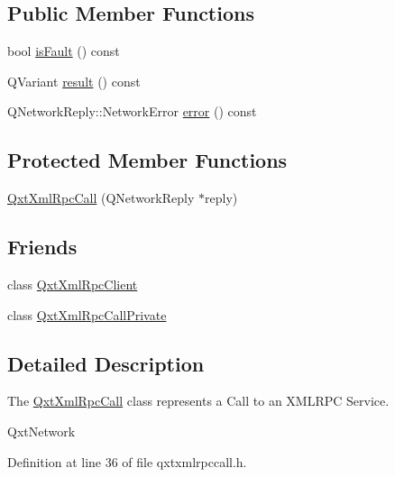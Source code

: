 \subsection*{Public Member Functions}
\begin{DoxyCompactItemize}
\item 
bool \hyperlink{class_qxt_xml_rpc_call_ace6d7c474d02814459d06bb5fdd4cf38}{is\-Fault} () const 
\item 
Q\-Variant \hyperlink{class_qxt_xml_rpc_call_ab9f0cf68b3df46df0869b1151cec5679}{result} () const 
\item 
Q\-Network\-Reply\-::\-Network\-Error \hyperlink{class_qxt_xml_rpc_call_a9b0287ce68a4fdedc83f182f1774b299}{error} () const 
\end{DoxyCompactItemize}
\subsection*{Protected Member Functions}
\begin{DoxyCompactItemize}
\item 
\hyperlink{class_qxt_xml_rpc_call_ae2efa1872f298cf6ec2bd3164732b65e}{Qxt\-Xml\-Rpc\-Call} (Q\-Network\-Reply $\ast$reply)
\end{DoxyCompactItemize}
\subsection*{Friends}
\begin{DoxyCompactItemize}
\item 
class \hyperlink{class_qxt_xml_rpc_call_aea1a90c8570af2b2d82b175cd24007d9}{Qxt\-Xml\-Rpc\-Client}
\item 
class \hyperlink{class_qxt_xml_rpc_call_aba91315452bd2c1855a6e5de23cc17fb}{Qxt\-Xml\-Rpc\-Call\-Private}
\end{DoxyCompactItemize}


\subsection{Detailed Description}
The \hyperlink{class_qxt_xml_rpc_call}{Qxt\-Xml\-Rpc\-Call} class represents a Call to an X\-M\-L\-R\-P\-C Service. 

Qxt\-Network 

Definition at line 36 of file qxtxmlrpccall.\-h.



